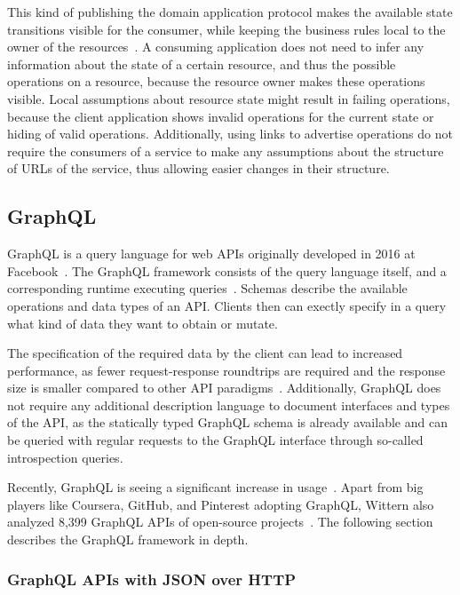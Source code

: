 This kind of publishing the domain application protocol makes the available state transitions visible for the consumer, while keeping the business rules local to the owner of the resources~\cite{Webber2010}.
A consuming application does not need to infer any information about the state of a certain resource, and thus the possible operations on a resource, because the resource owner makes these operations visible.
Local assumptions about resource state might result in failing operations, because the client application shows invalid operations for the current state or hiding of valid operations.
Additionally, using links to advertise operations do not require the consumers of a service to make any assumptions about the structure of \acp{URL} of the service, thus allowing easier changes in their structure.

\subsection{GraphQL}

GraphQL is a query language for web \acp{API} originally developed in 2016 at Facebook~\cite{Hartig2017}.
The GraphQL framework consists of the query language itself, and a corresponding runtime executing queries~\cite{Wittern2019}.
Schemas describe the available operations and data types of an \ac{API}.
Clients then can exectly specify in a query what kind of data they want to obtain or mutate.

The specification of the required data by the client can lead to increased performance, as fewer request-response roundtrips are required and the response size is smaller compared to other \ac{API} paradigms~\cite{Wittern2019}.
Additionally, GraphQL does not require any additional description language to document interfaces and types of the \ac{API}, as the statically typed GraphQL schema is already available and can be queried with regular requests to the GraphQL interface through so-called introspection queries.

Recently, GraphQL is seeing a significant increase in usage~\cite{Hartig2017}.
Apart from big players like Coursera, GitHub, and Pinterest adopting GraphQL, Wittern also analyzed 8,399 GraphQL \acp{API} of open-source projects~\cite{Wittern2019}.
The following section describes the GraphQL framework in depth.

\subsubsection{GraphQL \acp{API} with \ac{JSON} over \ac{HTTP}}\label{sec:graphql-http}

